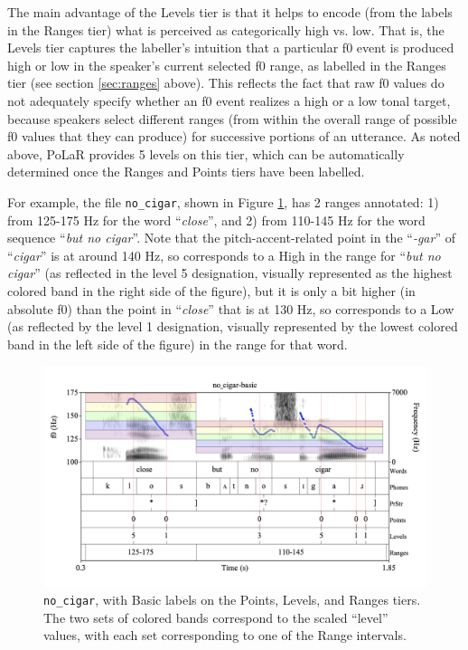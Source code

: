 \documentclass[11pt, twoside]{memoir}
\def\langtext#1{\textit{#1}}
\begin{document}
The main advantage of the Levels tier is that it helps to encode (from the labels in the Ranges tier) what is perceived as categorically high vs. low. That is, the Levels tier captures the labeller’s intuition that a particular f0 event is produced high or low in the speaker’s current selected f0 range, as labelled in the Ranges tier (see section \ref{sec:ranges} above). This reflects the fact that raw f0 values do not adequately specify whether an f0 event realizes a high or a low tonal target, because speakers select different ranges (from within the overall range of possible f0 values that they can produce) for successive portions of an utterance. As noted above, PoLaR provides 5 levels on this tier, which can be automatically determined once the Ranges and Points tiers have been labelled.

For example, the file \texttt{no\_cigar}, shown in Figure \ref{fig:no_cigar Levels basic}, has 2 ranges annotated: 1) from 125-175 Hz for the word “\langtext{close}”, and 2) from 110-145 Hz for the word sequence “\langtext{but no cigar}”. Note that the pitch-accent-related point in the “\langtext{-gar}” of “\langtext{cigar}” is at around 140 Hz, so corresponds to a High in the range for “\langtext{but no cigar}” (as reflected in the level 5 designation, visually represented as the highest colored band in the right side of the figure), but it is only a bit higher (in absolute f0) than the point in “\langtext{close}” that is at 130 Hz, so corresponds to a Low (as reflected by the level 1 designation, visually represented by the lowest colored band in the left side of the figure) in the range for that word.

\begin{figure}[H]
\centering
%
\includegraphics[width=.875\linewidth]{Levels-no_cigar-basic-rainbow.png}
%
\caption[\texttt{no\_cigar}, with Basic labels and overlaid colored bands.]{\texttt{no\_cigar}, with Basic labels on the Points, Levels, and Ranges tiers. The two sets of colored bands correspond to the scaled “level” values, with each set corresponding to one of the Range intervals.%
\label{fig:no_cigar Levels basic}%
%
}
\end{figure}
\end{document}
